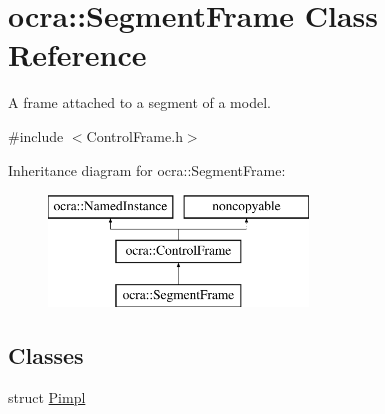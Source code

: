 \hypertarget{classocra_1_1SegmentFrame}{}\section{ocra\+:\+:Segment\+Frame Class Reference}
\label{classocra_1_1SegmentFrame}


A frame attached to a segment of a model.  




{\ttfamily \#include $<$Control\+Frame.\+h$>$}

Inheritance diagram for ocra\+:\+:Segment\+Frame\+:\begin{figure}[H]
\begin{center}
\leavevmode
\includegraphics[height=3.000000cm]{d1/d45/classocra_1_1SegmentFrame}
\end{center}
\end{figure}
\subsection*{Classes}
\begin{DoxyCompactItemize}
\item 
struct \hyperlink{structocra_1_1SegmentFrame_1_1Pimpl}{Pimpl}
\end{DoxyCompactItemize}
